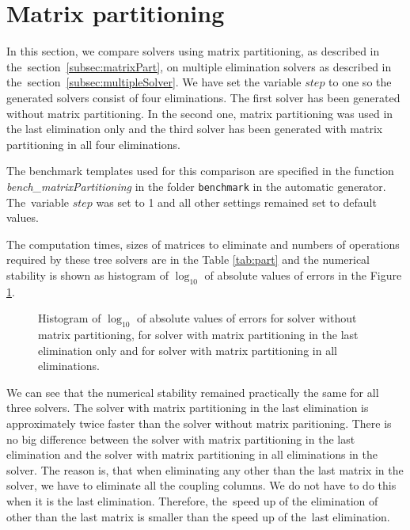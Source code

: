 \section{Matrix partitioning}
\label{exp:part}
In this section, we compare solvers using matrix partitioning, as described in the~section~\ref{subsec:matrixPart}, on multiple elimination solvers as described in the~section~\ref{subsec:multipleSolver}. We have set the variable $step$ to one so the generated solvers consist of four eliminations. The first solver has been generated without matrix partitioning. In the second one, matrix partitioning was used in the last elimination only and the third solver has been generated with matrix partitioning in all four eliminations.

The benchmark templates used for this comparison are specified in the function \textit{bench\_\-mat\-rix\-Partitioning} in the folder \texttt{benchmark} in the automatic generator. The~variable $step$ was set to 1 and all other settings remained set to default values.

The computation times, sizes of matrices to eliminate and numbers of operations required by these tree solvers are in the Table \ref{tab:part} and the numerical stability is shown as histogram of $\log_{10}$ of absolute values of errors in the Figure \ref{graph:part}.

\begin{figure}[ht]
  \centering
  \resizebox{0.95\textwidth}{!}{}
  \caption{Histogram of $\log_{10}$ of absolute values of errors for solver without matrix partitioning, for solver with matrix partitioning in the last elimination only and for solver with matrix partitioning in all eliminations.}
  \label{graph:part}
\end{figure}

We can see that the numerical stability remained practically the same for all three solvers. The solver with matrix partitioning in the last elimination is approximately twice faster than the solver without matrix paritioning. There is no big difference between the solver with matrix partitioning in the last elimination and the solver with matrix partitioning in all eliminations in the solver. The reason is, that when eliminating any other than the last matrix in the solver, we have to eliminate all the coupling columns. We do not have to do this when it is the last elimination. Therefore, the~speed up of the elimination of other than the last matrix is smaller than the speed up of the~last elimination.

